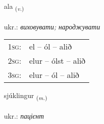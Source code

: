 \documentclass[frontgrid, backgrid]{flacards}\usepackage[]{graphicx}\usepackage[]{xcolor}
\begin{document}
\renewcommand{\flhead}{\vskip5pt \fboxsep=0pt {\small\bfseries\footnotesize Sagnorð | дієслово}}
\renewcommand{\fcfoot}{\vskip5pt \fboxsep=0pt \hspace{2pt}{\small\bfseries\footnotesize 1K}}

\renewcommand{\blhead}{\vskip5pt {\small\bfseries\footnotesize Sagnorð | дієслово }}
\renewcommand{\bcfoot}{\vskip5pt \hspace{2pt}{\small\bfseries\footnotesize 1K}}


{ala \small{\textsubscript{(\textit{v.})}} \\[1ex] %
\textphonetic{[aːla]} \\
ukr.: \emph{виховувати; народжувати} \\  [2ex]
\renewcommand*{\arraystretch}{0.8}
\begin{tabular}{p{1cm}l}
\textsc{1sg}: & el -- ól -- alið \\ 
\textsc{2sg}: & elur -- ólst -- alið \\ 
\textsc{3sg}: & elur -- ól -- alið \\ 
\end{tabular}
}

\renewcommand{\flhead}{\vskip5pt \fboxsep=0pt {\small\bfseries\footnotesize Nafnorð | іменник}}
\renewcommand{\fcfoot}{\vskip5pt \fboxsep=0pt \hspace{2pt}{\small\bfseries\footnotesize 1K}}

\renewcommand{\blhead}{\vskip5pt {\small\bfseries\footnotesize Nafnorð | іменник }}
\renewcommand{\bcfoot}{\vskip5pt \hspace{2pt}{\small\bfseries\footnotesize 1K}}


{sjúklingur \small{\textsubscript{(\textit{m.})}} \\[1ex] %
\textphonetic{[sjuhkliŋkʏr]} \\
ukr.: \emph{пацієнт} \\  [2ex]
\renewcommand*{\arraystretch}{0.8}
}
\end{document}
